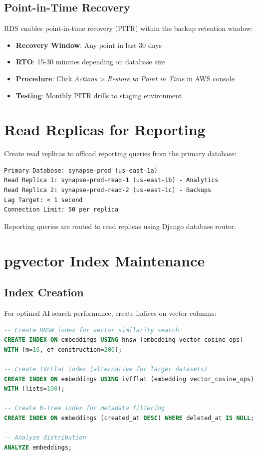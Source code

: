 \documentclass{report}
\begin{document}
\subsection{Point-in-Time Recovery}

RDS enables point-in-time recovery (PITR) within the backup retention window:

\begin{itemize}
  \item \textbf{Recovery Window}: Any point in last 30 days
  \item \textbf{RTO}: 15-30 minutes depending on database size
  \item \textbf{Procedure}: Click \textit{Actions} > \textit{Restore to Point in Time} in AWS console
  \item \textbf{Testing}: Monthly PITR drills to staging environment
\end{itemize}

\section{Read Replicas for Reporting}

Create read replicas to offload reporting queries from the primary database:

\begin{lstlisting}[caption=Read Replica Configuration]
Primary Database: synapse-prod (us-east-1a)
Read Replica 1: synapse-prod-read-1 (us-east-1b) - Analytics
Read Replica 2: synapse-prod-read-2 (us-east-1c) - Backups
Lag Target: < 1 second
Connection Limit: 50 per replica
\end{lstlisting}

Reporting queries are routed to read replicas using Django database router.

\section{pgvector Index Maintenance}

\subsection{Index Creation}

For optimal AI search performance, create indices on vector columns:

\begin{lstlisting}[language=sql, caption=pgvector Index Creation]
-- Create HNSW index for vector similarity search
CREATE INDEX ON embeddings USING hnsw (embedding vector_cosine_ops)
WITH (m=16, ef_construction=200);

-- Create IVFFlat index (alternative for larger datasets)
CREATE INDEX ON embeddings USING ivfflat (embedding vector_cosine_ops)
WITH (lists=100);

-- Create B-tree index for metadata filtering
CREATE INDEX ON embeddings (created_at DESC) WHERE deleted_at IS NULL;

-- Analyze distribution
ANALYZE embeddings;
\end{lstlisting}
\end{document}
